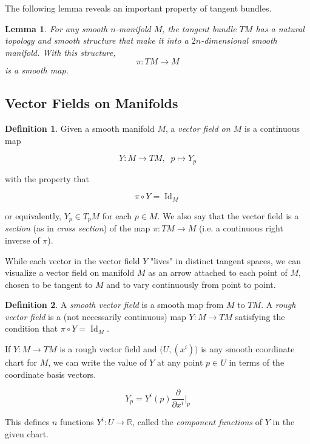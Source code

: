 \documentclass{article}
\DeclareMathOperator{\Id}{Id}
\newtheorem{lemma}[theorem]{Lemma}
\theoremstyle{remark}
\theoremstyle{definition}
\newtheorem{definition}{Definition}[section]
\begin{document}
    The following lemma reveals an important property of tangent bundles. 

    \begin{lemma}
      For any smooth $n$-manifold $M$, the tangent bundle $TM$ has a natural topology and smooth structure that make it into a $2n$-dimensional smooth manifold. With this structure, 
        \[\pi: TM \longrightarrow M\]
      is a smooth map. 
    \end{lemma}

  \subsection{Vector Fields on Manifolds}

    \begin{definition}
      Given a smooth manifold $M$, a \textit{vector field on $M$} is a continuous map 

        \[Y: M \longrightarrow TM, \;\; p \mapsto Y_p\]

      with the property that 

        \[\pi \circ Y = \Id_M\]

      or equivalently, $Y_p \in T_p M$ for each $p \in M$. We also say that the vector field is a \textit{section} (as in \textit{cross section}) of the map $\pi: TM \longrightarrow M$ (i.e. a continuous right inverse of $\pi$). 
    \end{definition}

    While each vector in the vector field $Y$ "lives" in distinct tangent spaces, we can visualize a vector field on manifold $M$ as an arrow attached to each point of $M$, chosen to be tangent to $M$ and to vary continuously from point to point. 

    \begin{definition}
      A \textit{smooth vector field} is a smooth map from $M$ to $TM$. A \textit{rough vector field} is a (not necessarily continuous) map $Y: M \longrightarrow TM$ satisfying the condition that $\pi\circ Y = \Id_M$. 
    \end{definition}

    If $Y: M \longrightarrow TM$ is a rough vector field and $\big( U, (x^i)\big)$ is any smooth coordinate chart for $M$, we can write the value of $Y$ at any point $p \in U$ in terms of the coordinate basis vectors. 

      \[Y_p = Y^i (p) \frac{\partial}{\partial x^i} \bigg|_p\]

    This defines $n$ functions $Y^i: U \longrightarrow \mathbb{R}$, called the \textit{component functions} of $Y$ in the given chart. 
\end{document}
